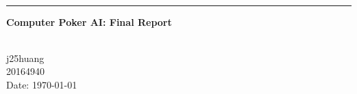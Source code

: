 \begin{titlepage}
\begin{center}


      \huge \textbf{\thetitle}
\\[0.30em]	  {\hrule height0.02em}

\vspace{0.5em}
	\Large \textbf{Computer Poker AI: Final Report}

    \vfill
    \small
	\textbf{\theauthor}
\\[1.2em]
    
	j25huang
	\\20164940
\\[3em]
	
      Date: \today


\end{center}
\end{titlepage}
\clearpage
